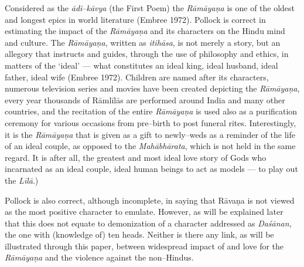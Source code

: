 Considered as the \textit{ādi–kāvya} (the First Poem) the \textit{Rāmāyaṇa} is one of the oldest and longest epics in world literature (Embree 1972). Pollock is correct in estimating the impact of the \textit{Rāmāyaṇa} and its characters on the Hindu mind and culture. The \textit{Rāmāyaṇa}, written as \textit{itihāsa}, is not merely a story, but an allegory that instructs and guides, through the use of philosophy and ethics, in matters of the ‘ideal’ — what constitutes an ideal king, ideal husband, ideal father, ideal wife (Embree 1972). Children are named after its characters, numerous television series and movies have been created depicting the \textit{Rāmāyaṇa}, every year thousands of Rāmlīlās are performed around India and many other countries, and the recitation of the entire \textit{Rāmāyaṇa} is used also as a purification ceremony for various occasions from pre–birth to post funeral rites. Interestingly, it is the \textit{Rāmāyaṇa} that is given as a gift to newly–weds as a reminder of the life of an ideal couple, as opposed to the \textit{Mahābhārata}, which is not held in the same regard. It is after all, the greatest and most ideal love story of Gods who incarnated as an ideal couple, ideal human beings to act as models — to play out the \textit{Līlā}.)

Pollock is also correct, although incomplete, in saying that Rāvaṇa is not viewed as the most positive character to emulate. However, as will be explained later that this does not equate to demonization of a character addressed as \textit{Daśānan}, the one with (knowledge of) ten heads. Neither is there any link, as will be illustrated through this paper, between widespread impact of and love for the \textit{Rāmāyaṇa} and the violence against the non–Hindus.


